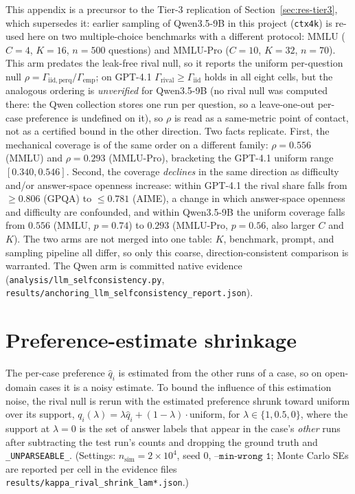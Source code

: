 \documentclass{article}
\newcommand{\agreementIndex}{\Gamma}
\begin{document}
This appendix is a precursor to the Tier-3 replication of
Section~\ref{sec:res-tier3}, which supersedes it: earlier sampling of
Qwen3.5-9B in this project (\texttt{ctx4k}) is re-used here
on two multiple-choice benchmarks with a different
protocol: MMLU ($C=4$, $K=16$, $n=500$ questions) and MMLU-Pro ($C=10$,
$K=32$, $n=70$). This arm predates the leak-free rival null, so it
reports the uniform per-question null $\rho=\agreementIndex_{\mathrm{iid,perq}}/
\agreementIndex_{\mathrm{emp}}$; on GPT-4.1 $\agreementIndex_{\mathrm{rival}}\ge
\agreementIndex_{\mathrm{iid}}$ holds in all eight cells, but the analogous
ordering is \emph{unverified} for Qwen3.5-9B (no rival null was computed
there: the Qwen collection stores one run per question, so a
leave-one-out per-case preference is undefined on it), so $\rho$ is read
as a same-metric point of contact, not as a
certified bound in the other direction. Two facts replicate. First, the mechanical coverage is of
the same order on a
different family: $\rho=0.556$ (MMLU) and $\rho=0.293$ (MMLU-Pro),
bracketing the GPT-4.1 uniform range $[0.340,0.546]$. Second, the coverage
\emph{declines} in the same direction as difficulty and/or answer-space
openness increase: within GPT-4.1 the rival share falls from
$\ge0.806$ (GPQA) to $\le0.781$ (AIME), a change in which answer-space
openness and difficulty are confounded, and within Qwen3.5-9B the
uniform coverage falls from $0.556$ (MMLU, $p=0.74$) to $0.293$ (MMLU-Pro,
$p=0.56$, also larger $C$ and $K$). The two arms are not merged into one table: $K$, benchmark, prompt, and sampling pipeline all differ, so only
this coarse, direction-consistent comparison is warranted. The Qwen arm
is committed native evidence (\texttt{analysis/llm\_selfconsistency.py},
\texttt{results/anchoring\_llm\_selfconsistency\_report.json}).

\section{Preference-estimate shrinkage}
\label{app:shrink}

The per-case preference $\hat q_i$ is estimated from the other runs of a
case, so on open-domain cases it is a noisy estimate. To bound the
influence of this estimation noise, the rival null is rerun with the
estimated preference shrunk toward uniform over its support,
$q_i(\lambda)=\lambda\hat q_i+(1-\lambda)\cdot\mathrm{uniform}$, for
$\lambda\in\{1,0.5,0\}$, where the support at $\lambda=0$ is the set of
answer labels that appear in the case's \emph{other} runs after
subtracting the test run's counts and dropping the ground truth and
\texttt{\_UNPARSEABLE\_}. (Settings: $n_{\mathrm{sim}}=2\times10^4$,
seed 0, $\texttt{--min-wrong 1}$; Monte Carlo SEs are reported per cell
in the evidence files \texttt{results/kappa\_rival\_shrink\_lam*.json}.)
\end{document}
